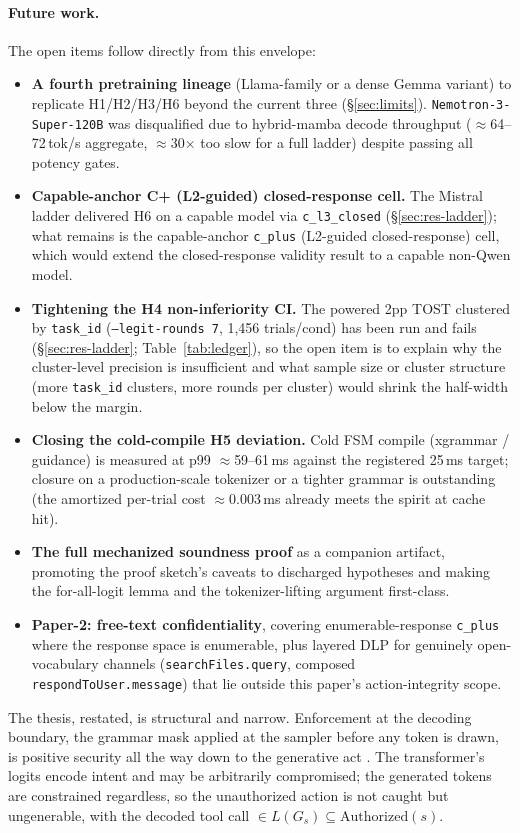 \paragraph{Future work.} The open items follow directly from this envelope:
\begin{itemize}[leftmargin=1.4em]
  \item \textbf{A fourth pretraining lineage} (Llama-family or a dense Gemma variant) to replicate H1/H2/H3/H6 beyond the current three (\S\ref{sec:limits}). \texttt{Nemotron-3-Super-120B} was disqualified due to hybrid-mamba decode throughput (\(\approx\)64--72\,tok/s aggregate, \(\approx\)30\(\times\) too slow for a full ladder) despite passing all potency gates.
  \item \textbf{Capable-anchor C+ (L2-guided) closed-response cell.} The Mistral ladder delivered H6 on a capable model via \texttt{c\_l3\_closed} (\S\ref{sec:res-ladder}); what remains is the capable-anchor \texttt{c\_plus} (L2-guided closed-response) cell, which would extend the closed-response validity result to a capable non-Qwen model.
  \item \textbf{Tightening the H4 non-inferiority CI.} The powered 2pp TOST clustered by \texttt{task\_id} (\texttt{--legit-rounds 7}, 1{,}456 trials/cond) has been run and fails (\S\ref{sec:res-ladder}; Table~\ref{tab:ledger}), so the open item is to explain why the cluster-level precision is insufficient and what sample size or cluster structure (more \texttt{task\_id} clusters, more rounds per cluster) would shrink the half-width below the margin.
  \item \textbf{Closing the cold-compile H5 deviation.} Cold FSM compile (xgrammar \cite{dong2024xgrammar} / guidance) is measured at p99 \(\approx\)59--61\,ms against the registered 25\,ms target; closure on a production-scale tokenizer or a tighter grammar is outstanding (the amortized per-trial cost \(\approx\)0.003\,ms already meets the spirit at cache hit).
  \item \textbf{The full mechanized soundness proof} as a companion artifact, promoting the proof sketch's caveats to discharged hypotheses and making the for-all-logit lemma and the tokenizer-lifting argument first-class.
  \item \textbf{Paper-2: free-text confidentiality}, covering enumerable-response \texttt{c\_plus} where the response space is enumerable, plus layered DLP for genuinely open-vocabulary channels (\texttt{searchFiles.query}, composed \texttt{respondToUser.message}) that lie outside this paper's action-integrity scope.
\end{itemize}

The thesis, restated, is structural and narrow. Enforcement at the decoding boundary, the grammar mask applied at the sampler before any token is drawn, is positive security all the way down to the generative act \cite{saltzer1975,anderson1972}. The transformer's logits encode intent and may be arbitrarily compromised; the generated tokens are constrained regardless, so the unauthorized action is not caught but ungenerable, with the decoded tool call \(\in L(G_s) \subseteq \mathrm{Authorized}(s)\).
